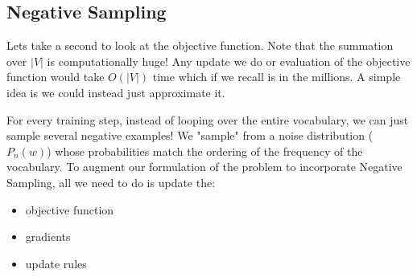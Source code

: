 \documentclass{tufte-handout}
\begin{document}

\subsection{Negative Sampling}

Lets take a second to look at the objective function. Note that the summation over $|V|$ is computationally huge! Any update we do or evaluation of the objective function would take $O(|V|)$ time which if we recall is in the millions. A simple idea is we could instead just approximate it.

For every training step, instead of looping over the entire vocabulary, we can just sample several negative examples! We "sample" from a noise distribution ($P_n(w)$) whose probabilities match the ordering of the frequency of the vocabulary. To augment our formulation of the problem to incorporate Negative Sampling, all we need to do is update the:
\begin{itemize}
\item objective function
\item gradients
\item update rules
\end{itemize}
\end{document}
